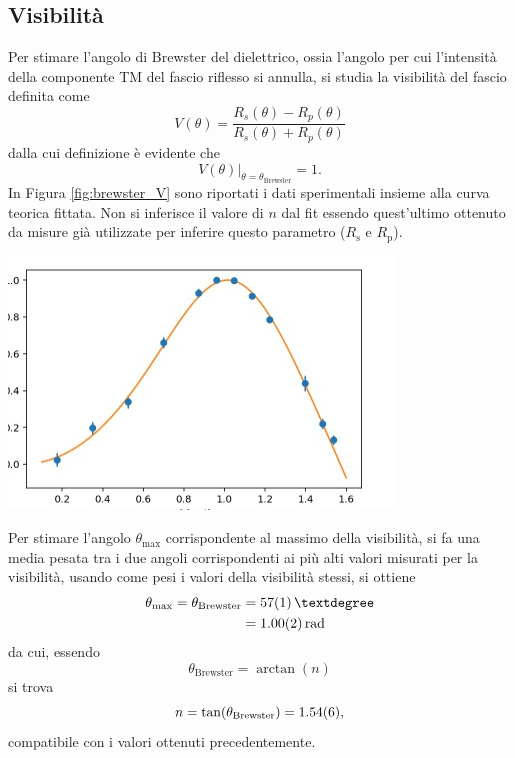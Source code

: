 \documentclass[10pt,oneside,a4paper]{article}
\newenvironment{Figure}
  {\par\medskip\noindent\minipage{\linewidth}}
  {\endminipage\par\medskip}
\begin{document}
\begin{multicols}{2}
\subsection{Visibilità}
Per stimare l'angolo di Brewster del dielettrico, ossia l'angolo per cui l'intensità della componente TM del fascio riflesso si annulla, si studia la visibilità del fascio definita come
\begin{equation}\label{eq:visibilità}
	V(\theta) = \frac{R_s(\theta) - R_p(\theta)}{R_s(\theta) + R_p(\theta)}
\end{equation}
dalla cui definizione è evidente che
\begin{equation}
	\left. V(\theta) \right\vert_{\theta = \theta_\mathrm{Brewster}} = 1.
\end{equation}
In Figura \ref{fig:brewster_V} sono riportati i dati sperimentali insieme alla curva teorica fittata. Non si inferisce il valore di $n$ dal fit essendo quest'ultimo ottenuto da misure già utilizzate per inferire questo parametro ($R_\mathrm{s}$ e $R_\mathrm{p}$).
\begin{Figure}
	\begin{center}
	\includegraphics[width=\linewidth]{visibilita.jpg}
	\label{fig:brewster_V}
	\end{center}
\end{Figure}
Per stimare l'angolo $\theta_\mathrm{max}$ corrispondente al massimo della visibilità, si fa una media pesata tra i due angoli corrispondenti ai più alti valori misurati per la visibilità, usando come pesi i valori della visibilità stessi, si ottiene
\begin{align}
	\theta_\mathrm{max} = \theta_\mathrm{Brewster} &= \SI{57 \pm 1}{°} \\ &= \SI{1.00 \pm 0.02}{\mathrm{rad}}
\end{align}
da cui, essendo 
\begin{equation}
	\theta_\mathrm{Brewster} = \arctan (n)
\end{equation}
si trova 
\begin{equation}
	n = \tan (\theta_\mathrm{Brewster} )= \SI{1.54 \pm 0.06}{},
\end{equation}
compatibile con i valori ottenuti precedentemente.

\end{multicols}
\end{document}
